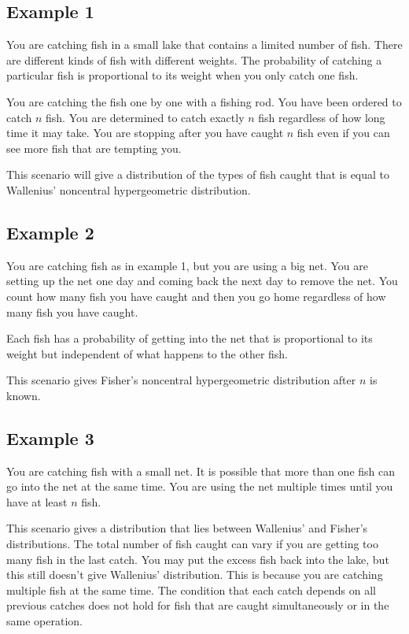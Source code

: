 \documentclass[a4paper]{article}
\begin{document}
\subsection{Example 1}
You are catching fish in a small lake that contains a limited number of fish. 
There are different kinds of fish with different weights. The probability of
catching a particular fish is proportional to its weight when you only catch
one fish.

You are catching the fish one by one with a fishing rod. You have been ordered
to catch $n$ fish. You are determined to catch exactly $n$ fish regardless of
how long time it may take. You are stopping after you have caught $n$ fish
even if you can see more fish that are tempting you.

This scenario will give a distribution of the types of fish caught that is equal to 
Wallenius' noncentral hypergeometric distribution.

\subsection{Example 2}
You are catching fish as in example 1, but you are using a big net.
You are setting up the net one day and coming back the next day to
remove the net. You count how many fish you have caught and then you go 
home regardless of how many fish you have caught.

Each fish has a probability of getting into the net that is proportional
to its weight but independent of what happens to the other fish.

This scenario gives Fisher's noncentral hypergeometric distribution after
$n$ is known.

\subsection{Example 3}
You are catching fish with a small net. It is possible that more than one
fish can go into the net at the same time. You are using the net multiple
times until you have at least $n$ fish.

This scenario gives a distribution that lies between Wallenius' and Fisher's
distributions. The total number of fish caught can vary if you are getting too 
many fish in the last catch. You may put the excess fish back into the lake,
but this still doesn't give Wallenius' distribution. This is because you
are catching multiple fish at the same time. The condition that each catch
depends on all previous catches does not hold for fish that are caught 
simultaneously or in the same operation.
\end{document}

